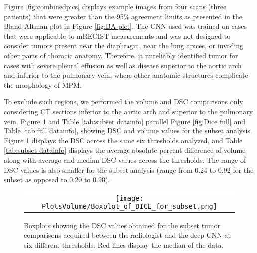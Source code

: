 \documentclass{article}
\begin{document}
Figure \ref{fig:combinedpics} displays example images from four scans (three patients) that were greater than the 95\% agreement limits as presented in the Bland-Altman plot in Figure \ref{fig:BA plot}. The CNN used was trained on cases that were applicable to mRECIST measurements and was not designed to consider tumors present near the diaphragm, near the lung apices, or invading other parts of thoracic anatomy. Therefore, it unreliably identified tumor for cases with severe pleural effusion as well as disease superior to the aortic arch and inferior to the pulmonary vein, where other anatomic structures complicate the morphology of MPM. 

To exclude such regions, we performed the volume and DSC comparisons only considering CT sections inferior to the aortic arch and superior to the pulmonary vein. Figure \ref{fig:Dice subset} and Table \ref{tab:subset datainfo} parallel Figure \ref{fig:Dice full} and Table \ref{tab:full datainfo}, showing DSC and volume values for the subset analysis. Figure \ref{fig:Dice subset} displays the DSC across the same six thresholds analyzed, and Table \ref{tab:subset datainfo} displays the average absolute percent difference of volume along with average and median DSC values across the thresholds. The range of DSC values is also smaller for the subset analysis (range from 0.24 to 0.92 for the subset as opposed to 0.20 to 0.90).

\begin{figure} [h!]
   \begin{center}
   \begin{tabular}{c} %
   \texttt{[image: PlotsVolume/Boxplot\_of\_DICE\_for\_subset.png]}
   \end{tabular}
   \end{center}
   \caption{Boxplots showing the DSC values obtained for the subset tumor comparisons acquired between the radiologist and the deep CNN at six different thresholds. Red lines display the median of the data.}
   \label{fig:Dice subset}
\end{figure} 
\end{document}
